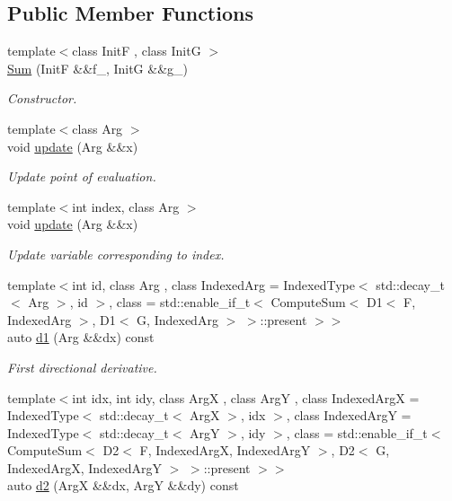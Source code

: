 \subsection*{Public Member Functions}
\begin{DoxyCompactItemize}
\item 
{\footnotesize template$<$class Init\-F , class Init\-G $>$ }\\\hyperlink{structFunG_1_1MathematicalOperations_1_1Sum_a7b04c111c5f6f2bafda3684f262d146e}{Sum} (Init\-F \&\&f\-\_\-, Init\-G \&\&g\-\_\-)
\begin{DoxyCompactList}\small\item\em Constructor. \end{DoxyCompactList}\item 
{\footnotesize template$<$class Arg $>$ }\\void \hyperlink{structFunG_1_1MathematicalOperations_1_1Sum_a15985be13a1838d868d2adce8e4f5402}{update} (Arg \&\&x)
\begin{DoxyCompactList}\small\item\em Update point of evaluation. \end{DoxyCompactList}\item 
{\footnotesize template$<$int index, class Arg $>$ }\\void \hyperlink{structFunG_1_1MathematicalOperations_1_1Sum_a4e10622e11a29d739f0d4db364980f9a}{update} (Arg \&\&x)
\begin{DoxyCompactList}\small\item\em Update variable corresponding to index. \end{DoxyCompactList}\item 
{\footnotesize template$<$int id, class Arg , class Indexed\-Arg  = Indexed\-Type$<$ std\-::decay\-\_\-t$<$ Arg $>$, id $>$, class  = std\-::enable\-\_\-if\-\_\-t$<$                           Compute\-Sum$<$ D1$<$ F, Indexed\-Arg $>$, D1$<$ G, Indexed\-Arg $>$ $>$\-::present $>$$>$ }\\auto \hyperlink{structFunG_1_1MathematicalOperations_1_1Sum_aee8c204769ab30f5ae68f9a8b0fa9bf8}{d1} (Arg \&\&dx) const 
\begin{DoxyCompactList}\small\item\em First directional derivative. \end{DoxyCompactList}\item 
{\footnotesize template$<$int idx, int idy, class Arg\-X , class Arg\-Y , class Indexed\-Arg\-X  = Indexed\-Type$<$ std\-::decay\-\_\-t$<$ Arg\-X $>$, idx $>$, class Indexed\-Arg\-Y  = Indexed\-Type$<$ std\-::decay\-\_\-t$<$ Arg\-Y $>$, idy $>$, class  = std\-::enable\-\_\-if\-\_\-t$<$                           Compute\-Sum$<$ D2$<$ F, Indexed\-Arg\-X, Indexed\-Arg\-Y $>$,                                       D2$<$ G, Indexed\-Arg\-X, Indexed\-Arg\-Y $>$ $>$\-::present $>$$>$ }\\auto \hyperlink{structFunG_1_1MathematicalOperations_1_1Sum_a2852f378176e93564ad85fa39331e21d}{d2} (Arg\-X \&\&dx, Arg\-Y \&\&dy) const 

\end{DoxyCompactItemize}

